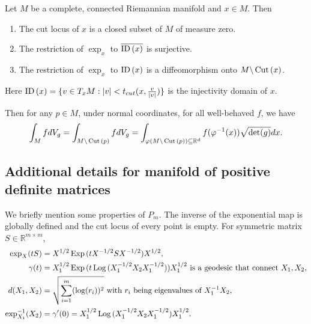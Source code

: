 \begin{theorem}
    {\cite[Theorem 10.34]{lee2018introduction}}
    Let $M$ be a complete, connected Riemannian manifold and $x \in M$.
    Then 
    \begin{enumerate}
        \item The cut locus of $x$ is a closed subset of $M$ of measure zero.
        \item The restriction of $\exp_{x}$ to $\overline{\operatorname{ID\,}(x)}$ is surjective.
        \item The restriction of $\exp_{x}$ to $\operatorname{ID\,}(x)$ is a diffeomorphism onto $M \backslash \operatorname{Cut\,}(x)$.
    \end{enumerate}
    Here $\operatorname{ID\,}(x) = \{v \in T_{x}M: |v| < t_{cut}(x, \frac{v}{|v|})\}$ is the injectivity domain of $x$.
\end{theorem}
Then for any $p \in M$, under normal coordinates, for all well-behaved $f$, we have 
\begin{align*}
    \int_{M} f dV_{g}
    = \int_{M \backslash \operatorname{Cut\,}(p)} f dV_{g}
    = \int_{\varphi(M \backslash \operatorname{Cut\,}(p)) \subseteq \mathbb{R}^{d}} f(\varphi^{-1}(x))\sqrt{\det(g)} dx.
\end{align*}


\iffalse
\begin{lemma}\label{GRW_error}
    \cite[Special Case of Lemma 7]{}

    Let $x \in M$. Let $x(T)$ denote the result of time $T$ Brownian motion starting from $x$.
    Then under synchronous coupling, we can bound 
    \begin{align*}
        \mathbb{E}[d(x(T), \exp_{x}(B(T) \circ E))^{2}] \le C T^{3} d^{3}
    \end{align*}
    where $C > 0$ is some constant depending on curvature.
\end{lemma}
\fi


\subsection{Additional details for manifold of positive definite matrices}\label{psddetails}

We briefly mention some properties of $P_{m}$.
The inverse of the exponential map is globally defined and the cut locus of every point is empty.
For symmetric matrix $S \in \mathbb{R}^{m \times m}$, 
\begin{align*}
        \exp_{X}(tS) &= X^{1/2} \operatorname{Exp\,} (t X^{-1/2} S X^{-1/2}) X^{1/2}, \\
        \gamma(t) &= X_{1}^{1/2} \operatorname{Exp\,} (t \operatorname{Log\,} (X_{1}^{-1/2} X_{2} X_{1}^{-1/2}) ) X_{1}^{1/2} \text{ is a geodesic that connect } X_{1}, X_{2},\\
        d(X_{1}, X_{2}) &= \sqrt{\sum_{i = 1}^{m} (\log (r_{i}))^{2}} \text{ with } r_{i} \text{ being eigenvalues of } X_{1}^{-1} X_{2},\\
        \exp_{X_{1}}^{-1}(X_{2}) &= \gamma'(0) = X_{1}^{1/2} \operatorname{Log\,} (X_{1}^{-1/2} X_{2} X_{1}^{-1/2}) X_{1}^{1/2}.
\end{align*} 

